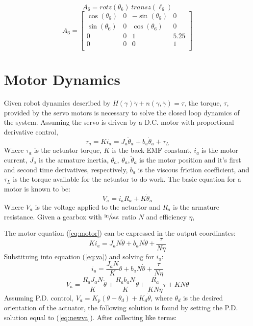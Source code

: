 \documentclass[12pt]{report}
\begin{document}
\vspace{.25ex}
\[
A_6 = rotz(\theta_6) ~ transz(\ell_6)
\]
\vspace{.5ex}
\[
A_6 =
\begin{bmatrix}
  \cos(\theta_6) & 0 & -\sin(\theta_6) & 0 \\
  \sin(\theta_6) & 0 & \cos(\theta_6) & 0 \\
  0 & 0 & 1 & 5.25 \\
  0 & 0 & 0 & 1 \\
\end{bmatrix}
\]

\newpage

\section{Motor Dynamics}
Given robot dynamics described by \(H(\gamma)\ddot{\gamma} + n(\gamma,\dot{\gamma}) = \tau\), the torque, $\tau$, provided by the servo motors is necessary to solve the closed loop dynamics of the system. Assuming the servo is driven by a D.C. motor with proportional derivative control,
\begin{equation}
  \tau_a = Ki_a = J_a\ddot{\theta}_a + b_a\dot{\theta}_a + \tau_L
  \label{eq:motor}
\end{equation}
Where $\tau_a$ is the actuator torque, $K$ is the back-EMF constant, $i_a$ is the motor current, $J_a$ is the armature inertia, $\theta_a,~\dot{\theta}_a,\ddot{\theta}_a$ is the motor position and it's first and second time derivatives, respectively, $b_a$ is the viscous friction coefficient, and $\tau_L$ is the torque available for the actuator to do work. The basic equation for a motor is known to be:
\begin{equation}
  V_a = i_aR_a + K\dot{\theta}_a
  \label{eq:va}
\end{equation}
Where $V_a$ is the voltage applied to the actuator and $R_a$ is the armature resistance. Given a gearbox with $\sfrac{\text{in}}{\text{out}}$ ratio $N$ and efficiency $\eta$,

The motor equation (\ref{eq:motor}) can be expressed in the output coordinates:
\[
Ki_a = J_aN\ddot{\theta} + b_aN\dot{\theta} + \frac{\tau}{N\eta}
\]
Substituing into equation (\ref{eq:va}) and solving for $i_a$:
\[
  i_a = \frac{J_aN}{K}\ddot{\theta} + b_aN\dot{\theta} + \frac{\tau}{N\eta}
\]
\begin{equation}
  V_a = \frac{R_aJ_aN}{K}\ddot{\theta} + \frac{R_ab_aN}{K}\dot{\theta} + \frac{R_a}{KN\eta}\tau + KN\dot{\theta}
  \label{eq:newva}
\end{equation}
Assuming P.D. control, \(V_a = K_p(\theta-\theta_d) + K_d\dot{\theta}\), where $\theta_d$ is the desired orientation of the actuator, the following solution is found by setting the P.D. solution equal to (\ref{eq:newva}). After collecting like terms:
\end{document}
